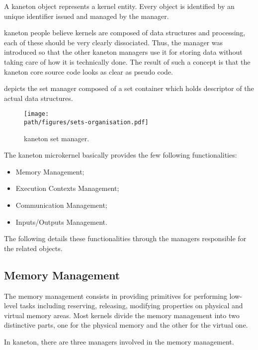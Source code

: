 A kaneton object represents a kernel entity. Every object is identified by
an unique identifier issued and managed by the  manager.

kaneton people believe kernels are composed of data structures and processing,
each of these should be very clearly dissociated. Thus, the 
manager was introduced so that the other kaneton managers use it for storing
data without taking care of how it is technically done. The result of such
a concept is that the kaneton core source code looks as clear as pseudo code.

 depicts the set manager
composed of a set container which holds descriptor of the actual data
structures.

\begin{figure}[h]
  \begin{center}
    \texttt{[image: \\path/figures/sets-organisation.pdf]}
    \caption{kaneton set manager.}
    \label{figure:sets-organisation}
  \end{center}
\end{figure}

The kaneton microkernel basically provides the few following functionalities:

\begin{itemize}
  \item
    Memory Management;
  \item
    Execution Contexts Management;
  \item
    Communication Management;
  \item
    Inputs/Outputs Management.
\end{itemize}

The following details these functionalities through the managers responsible
for the related objects.


\subsection*{Memory Management}

The memory management consists in providing primitives for performing low-level
tasks including reserving, releasing, modifying properties on physical and
virtual memory areas. Most kernels divide the memory management into two
distinctive parts, one for the physical memory and the other for the virtual
one.

In kaneton, there are three managers involved in the memory management.


